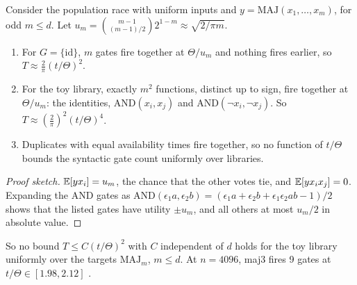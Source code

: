 \begin{proposition}\label{prop:app-A22}
\quad Consider the population race with uniform inputs and $y=\mathrm{MAJ}(x_1,\dots,x_m)$, for odd $m\le d$. Let $u_m=\binom{m-1}{(m-1)/2}2^{1-m}\approx\sqrt{2/\pi m}$.
\begin{enumerate}[label=(\arabic*),nosep]
\item For $G=\{\mathrm{id}\}$, $m$ gates fire together at $\Theta/u_m$ and nothing fires earlier, so $T\approx\frac2\pi(t/\Theta)^2$.
\item For the toy library, exactly $m^2$ functions, distinct up to sign, fire together at $\Theta/u_m$: the identities, $\mathrm{AND}(x_i,x_j)$ and $\mathrm{AND}(\neg x_i,\neg x_j)$. So $T\approx(\frac2\pi)^2(t/\Theta)^4$.
\item Duplicates with equal availability times fire together, so no function of $t/\Theta$ bounds the syntactic gate count uniformly over libraries.
\end{enumerate}
\end{proposition}
\begin{proof}[Proof sketch]
$\mathbb{E}[yx_i]=u_m$, the chance that the other votes tie, and $\mathbb{E}[yx_ix_j]=0$. Expanding the AND gates as $\mathrm{AND}(\epsilon_1a,\epsilon_2b)=(\epsilon_1a+\epsilon_2b+\epsilon_1\epsilon_2ab-1)/2$ shows that the listed gates have utility $\pm u_m$, and all others at most $u_m/2$ in absolute value.
\end{proof}
So no bound $T\le C(t/\Theta)^2$ with $C$ independent of $d$ holds for the toy library uniformly over the targets $\mathrm{MAJ}_m$, $m\le d$. At $n=4096$, maj3 fires 9 gates at $t/\Theta\in[1.98,2.12]$ .

